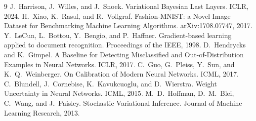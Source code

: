 \documentclass[11pt,a4paper]{article}
\begin{document}
\enlargethispage{4\baselineskip}
\begin{thebibliography}{9}
J.~Harrison, J.~Willes, and J.~Snoek.
Variational Bayesian Last Layers.
ICLR, 2024.
H.~Xiao, K.~Rasul, and R.~Vollgraf.
Fashion-MNIST: a Novel Image Dataset for Benchmarking Machine Learning Algorithms.
arXiv:1708.07747, 2017.
Y.~LeCun, L.~Bottou, Y.~Bengio, and P.~Haffner.
Gradient-based learning applied to document recognition.
Proceedings of the IEEE, 1998.
D.~Hendrycks and K.~Gimpel.
A Baseline for Detecting Misclassified and Out-of-Distribution Examples in Neural Networks.
ICLR, 2017.
C.~Guo, G.~Pleiss, Y.~Sun, and K.~Q.~Weinberger.
On Calibration of Modern Neural Networks.
ICML, 2017.
C.~Blundell, J.~Cornebise, K.~Kavukcuoglu, and D.~Wierstra.
Weight Uncertainty in Neural Networks.
ICML, 2015.
M.~D.~Hoffman, D.~M.~Blei, C.~Wang, and J.~Paisley.
Stochastic Variational Inference.
Journal of Machine Learning Research, 2013.
\end{thebibliography}
\end{document}
